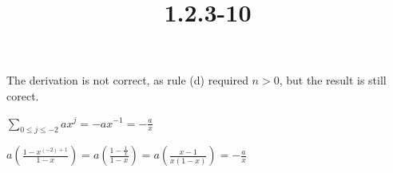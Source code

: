 \documentclass{article}
\title{1.2.3-10}
\begin{document}
\maketitle

The derivation is not correct, as rule (d) required \( n > 0 \), but the result is still corect.

\( \sum_{0 \leq j \leq -2} ax^j = -ax^{-1} = -\frac{a}{x} \)

\( a(\frac{1-x^{(-2)+1}}{1-x}) = a(\frac{1-\frac{1}{x}}{1-x}) = a(\frac{x-1}{x(1-x)}) = -\frac{a}{x} \)
\end{document}
